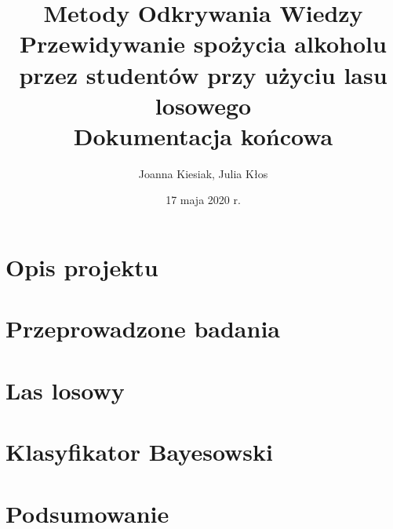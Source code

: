 \documentclass{article}
\title{{\normalfont Metody Odkrywania Wiedzy}\vspace{0.2cm} \\ 
\textbf{Przewidywanie spożycia alkoholu przez studentów przy użyciu lasu losowego}\\
\vspace{0.2cm}
\large{\normalfont Dokumentacja końcowa}}
\author{
Joanna Kiesiak, Julia Kłos\\

}
\date{17 maja 2020 r.}
\begin{document}
\maketitle



\section{Opis projektu}


\section{Przeprowadzone badania}


\section{Las losowy}


\section{Klasyfikator Bayesowski}


\section{Podsumowanie}


\printbibliography

\begin{appendices}


\

\end{appendices}
\end{document}
